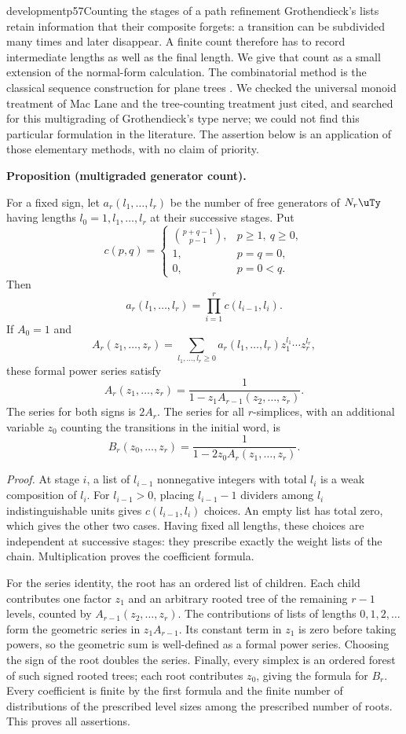 \begin{dcomment}{development}{p57}{Counting the stages of a path refinement}
Grothendieck's lists retain information that their composite forgets: a transition can be subdivided many times and later disappear. A finite count therefore has to record intermediate lengths as well as the final length. We give that count as a small extension of the normal-form calculation. The combinatorial method is the classical sequence construction for plane trees \citep[\S\S I.2 and I.5]{FlajoletSedgewick2009}. We checked the universal monoid treatment of Mac Lane and the tree-counting treatment just cited, and searched for this multigrading of Grothendieck's type nerve; we could not find this particular formulation in the literature. The assertion below is an application of those elementary methods, with no claim of priority.

\textbf{Proposition (multigraded generator count).}\ours\par
For a fixed sign, let $a_r(l_1,\ldots,l_r)$ be the number of free generators of $N_r\uTy$ having lengths $l_0=1,l_1,\ldots,l_r$ at their successive stages. Put
\[
 c(p,q)=
 \begin{cases}
 \binom{p+q-1}{p-1},&p\geq1,\ q\geq0,\\
 1,&p=q=0,\\
 0,&p=0<q.
 \end{cases}
\]
Then
\[
 a_r(l_1,\ldots,l_r)=\prod_{i=1}^r c(l_{i-1},l_i).
\]
If $A_0=1$ and
\[
 A_r(z_1,\ldots,z_r)=
 \sum_{l_1,\ldots,l_r\geq0}
 a_r(l_1,\ldots,l_r)z_1^{l_1}\cdots z_r^{l_r},
\]
these formal power series satisfy
\[
 A_r(z_1,\ldots,z_r)=
 \frac{1}{1-z_1A_{r-1}(z_2,\ldots,z_r)}.
\]
The series for both signs is $2A_r$. The series for all $r$-simplices, with an additional variable $z_0$ counting the transitions in the initial word, is
\[
 B_r(z_0,\ldots,z_r)=\frac{1}{1-2z_0A_r(z_1,\ldots,z_r)}.
\]

\emph{Proof.} At stage $i$, a list of $l_{i-1}$ nonnegative integers with total $l_i$ is a weak composition of $l_i$. For $l_{i-1}>0$, placing $l_{i-1}-1$ dividers among $l_i$ indistinguishable units gives $c(l_{i-1},l_i)$ choices. An empty list has total zero, which gives the other two cases. Having fixed all lengths, these choices are independent at successive stages: they prescribe exactly the weight lists of the chain. Multiplication proves the coefficient formula.

For the series identity, the root has an ordered list of children. Each child contributes one factor $z_1$ and an arbitrary rooted tree of the remaining $r-1$ levels, counted by $A_{r-1}(z_2,\ldots,z_r)$. The contributions of lists of lengths $0,1,2,\ldots$ form the geometric series in $z_1A_{r-1}$. Its constant term in $z_1$ is zero before taking powers, so the geometric sum is well-defined as a formal power series. Choosing the sign of the root doubles the series. Finally, every simplex is an ordered forest of such signed rooted trees; each root contributes $z_0$, giving the formula for $B_r$. Every coefficient is finite by the first formula and the finite number of distributions of the prescribed level sizes among the prescribed number of roots. This proves all assertions.


\end{dcomment}
